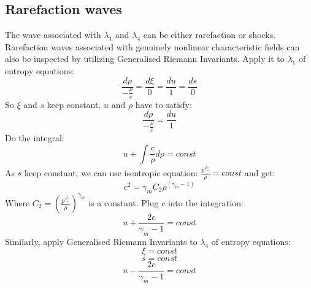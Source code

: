 \subsection{Rarefaction waves}
The wave associated with $\lambda_1$ and $\lambda_4$ can be either rarefaction or shocks.
Rarefaction waves associated with genuinely nonlinear characteristic fields can also be inspected by utilizing Generalised Riemann Invariants. Apply it to $\lambda_1$ of entropy equations: 
\begin{equation}
\frac{d \rho}{-\frac{\rho}{c}}=\frac{d \xi}{0} = \frac{d u}{1} = \frac{d s}{0}
\end{equation}
So $\xi$ and $s$ keep constant. $u$ and $\rho$ have to satisfy: 
\begin{equation}
\frac{d \rho}{-\frac{\rho}{c}} = \frac{d u}{1}
\end{equation} 
Do the integral: 
\begin{equation}
u+\int \frac{c}{\rho} d\rho =const
\end{equation}
As $s$ keep constant, we can use isentropic equation: $\frac{p^{\frac{1}{\gamma_m}}}{\rho}=const$ and get: 
\begin{equation}
c^2=\gamma_m C_2 \rho^{(\gamma_m -1)}
\end{equation}
Where $C_2 = \left(\frac{p^{\frac{1}{\gamma_m}}}{\rho}\right)^{\gamma_m}$ is a constant. Plug $c$ into the integration: 
\begin{equation}
u+\frac{2c}{\gamma_m -1} = const
\label{eq:RP-solution-rarefaction-u-lamda1}
\end{equation}
Similarly, apply Generalised Riemann Invariants to $\lambda_4$ of entropy equations:
\begin{equation}
\xi = const \label{eq:RP-solution-rarefaction-xi}
\end{equation}
\begin{equation}
s = const \label{eq:RP-solution-rarefaction-s}
\end{equation}
\begin{equation}
u-\frac{2c}{\gamma_m -1} = const 
\label{eq:RP-solution-rarefaction-u-lamda4}
\end{equation}

